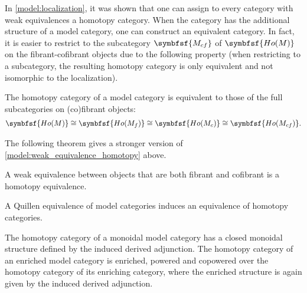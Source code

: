     In \cref{model:localization}, it was shown that one can assign to every category with weak equivalences a homotopy category. When the category has the additional structure of a model category, one can construct an equivalent category.
    In fact, it is easier to restrict to the subcategory $\symbfsf{M_{cf}}$ of $\symbfsf{Ho(M)}$ on the fibrant-cofibrant objects due to the following property (when restricting to a subcategory, the resulting homotopy category is only equivalent and not isomorphic to the localization).
    \begin{property}
        The homotopy category of a model category is equivalent to those of the full subcategories on (co)fibrant objects:
        \begin{gather}
            \symbfsf{Ho(M)}\cong\symbfsf{Ho(M_f)}\cong\symbfsf{Ho(M_c)}\cong\symbfsf{Ho(M_{cf})}.
        \end{gather}
    \end{property}

    The following theorem gives a stronger version of \cref{model:weak_equivalence_homotopy} above.
    \begin{theorem}[Whitehead]
        A weak equivalence between objects that are both fibrant and cofibrant is a homotopy equivalence.
    \end{theorem}

    \begin{property}
        A Quillen equivalence of model categories induces an equivalence of homotopy categories.
    \end{property}

    \begin{property}
        The homotopy category of a monoidal model category has a closed monoidal structure defined by the induced derived adjunction. The homotopy category of an enriched model category is enriched, powered and copowered over the homotopy category of its enriching category, where the enriched structure is again given by the induced derived adjunction.
    \end{property}

